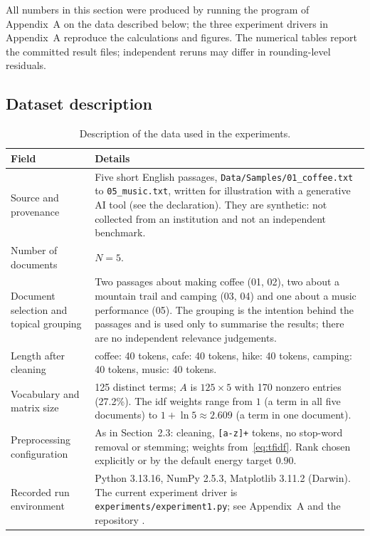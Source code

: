 \documentclass[12pt,a4paper]{report}
\newcommand{\runenv}{Python 3.13.16, NumPy 2.5.3, Matplotlib 3.11.2 (Darwin)}
\theoremstyle{plain}
\theoremstyle{definition}
\theoremstyle{remark}
\theoremstyle{definition}
\begin{document}
All numbers in this section were produced by running the program of Appendix~A on the data described below; the three experiment drivers in Appendix~A reproduce the calculations and figures. The numerical tables report the committed result files; independent reruns may differ in rounding-level residuals.

\subsection{Dataset description}\label{sec:dataset}

\begin{table}[H]
\centering
\caption{Description of the data used in the experiments.}\label{tab:dataset}
\small
\begin{tabular}{@{}p{}p{}@{}}
\toprule
Field & Details\\
\midrule
Source and provenance & Five short English passages, \texttt{Data/Samples/01\_coffee.txt} to \texttt{05\_music.txt}, written for illustration with a generative AI tool (see the declaration). They are synthetic: not collected from an institution and not an independent benchmark.\\
Number of documents & $N=5$.\\
Document selection and topical grouping & Two passages about making coffee (01, 02), two about a mountain trail and camping (03, 04) and one about a music performance (05). The grouping is the intention behind the passages and is used only to summarise the results; there are no independent relevance judgements.\\
Length after cleaning & coffee: 40 tokens, cafe: 40 tokens, hike: 40 tokens, camping: 40 tokens, music: 40 tokens.\\
Vocabulary and matrix size & 125 distinct terms; $A$ is $125\times5$ with 170 nonzero entries (27.2\%). The idf weights range from $1$ (a term in all five documents) to $1+\ln5\approx2.609$ (a term in one document).\\
Preprocessing configuration & As in Section~2.3: cleaning, \texttt{[a-z]+} tokens, no stop-word removal or stemming; weights from~\eqref{eq:tfidf}. Rank chosen explicitly or by the default energy target $0.90$.\\
Recorded run environment & \runenv. The current experiment driver is \texttt{experiments/experiment1.py}; see Appendix~A and the repository \cite{repo}.\\
\bottomrule
\end{tabular}
\end{table}
\end{document}
